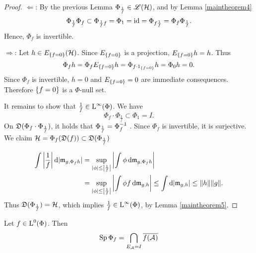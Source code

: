 \begin{proof}
 $\Leftarrow$: 
 By the previous Lemma $\Phi_\frac{1}{f} \in \mathscr{L}(\mathcal{H})$, and by Lemma 
 \ref{maintheorem4}
 \[
 \Phi_\frac{1}{f} \Phi_f \subset \Phi_{\frac{1}{f} f} = \Phi_1 = \operatorname{id} =
 \Phi_{f \frac{1}{f}} = \Phi_f \Phi_\frac{1}{f}.
 \]
Hence, $\Phi_f$ is invertible.

$\Rightarrow$:
Let $h \in E_{\left\lbrace f = 0\right\rbrace}(\mathcal{H})$. Since $E_{\left\lbrace f = 0\right\rbrace}$ is a
projection, $E_{\left\lbrace f = 0\right\rbrace} h = h$. Thus
\[
  \Phi_f h = \Phi_f E_{\left\lbrace f = 0\right\rbrace} h = \Phi_{f \cdot 
    1_{\left\lbrace f = 0\right\rbrace}} h = \Phi_0 h = 0.
\]
Since $\Phi_f $ is invertible, $h =0$ and $E_{\left\lbrace f = 0\right\rbrace} =0$ are
immediate consequences. Therefore $\left\lbrace f = 0\right\rbrace$ is a $\Phi$-null set. 

It remains to show that $ \frac{1}{f} \in {\text{L}^\infty }(\Phi)$. We have
\[
 \Phi_f \cdot \Phi_\frac{1}{f} \subset \Phi_1 = I.
\]
On $\mathfrak{D}(\Phi_f \cdot \Phi_\frac{1}{f}) $, it holds that $\Phi_\frac{1}{f}
= \Phi_f ^{-1}$ .
Since $\Phi_f$ is invertible, it is surjective. We claim $ \mathcal{H} = \Phi_f(\mathfrak{D}(f))
\subset \mathfrak{D}(\Phi_\frac{1}{f})$

\begin{align*}
  \int \left| \frac{1}{f} \right | \text{d}|\mathfrak{m}_{g,\Phi_f h}| &= \sup_{| \phi |
    \leq \left | \frac{1}{f} \right| } \left | \int \phi \operatorname{d}\! \mathfrak{m}_{g,\Phi_f h}
  \right| \\&= \sup_{| \phi | \leq \left| \frac{1}{f} \right |}
  \left| \int \phi f \operatorname{d}\! \mathfrak{m}_{g,h} \right| \leq \int \text{d}|\mathfrak{m}_{g,h}| \leq
  \| h \| \|g\|.
\end{align*}
Thus $\mathfrak{D}(\Phi_\frac{1}{f}) = \mathcal{H}$, which implies $\frac{1}{f} \in {\text{L}^\infty }(\Phi)$,
by Lemma \ref{maintheorem5}.
\end{proof}

\begin{lem} \label{maintheorem7}
 Let $f \in {\text{L}^0}(\Phi)$. Then 
 \[
 \operatorname{Sp} \Phi_f = \bigcap_{E_\mathcal{A} = I} \overline{f(\mathcal{A})}
 \]

\end{lem}

